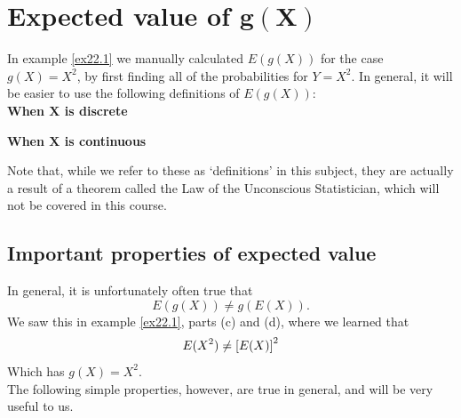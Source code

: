 \section{Expected value of $\boldsymbol{g(X)}$} \label{def E(g(X))}
In example \ref{ex22.1} we manually calculated $E(g(X))$ for the case $g(X) = X^2$, by first finding all of the probabilities for $Y = X^2$. In general, it will be easier to use the following definitions of $E(g(X))$: \\

\noindent\textbf{When $\boldsymbol{X}$ is discrete}

  	\bigskip
	
	\hfil{}
	\bigskip

\noindent \textbf{When $\boldsymbol{X}$ is continuous}

  	\bigskip
	
	\hfil{}
	\bigskip

\noindent Note that, while we refer to these as `definitions' in this subject, they are actually a result of a theorem called the Law of the Unconscious Statistician, which will not be covered in this course. 

\subsection{Important properties of expected value} \label{sec22.01}
In general, it is unfortunately often true that
\[
E(g(X)) \neq g(E(X)).
\]
We saw this in example \ref{ex22.1}, parts (c) and (d), where we learned that
\[
E(X^2) \neq \left[E(X)\right]^2 
\]
Which has $g(X) = X^2$. \\

\noindent The following simple properties, however, are true in general, and will be very useful to us. \\


